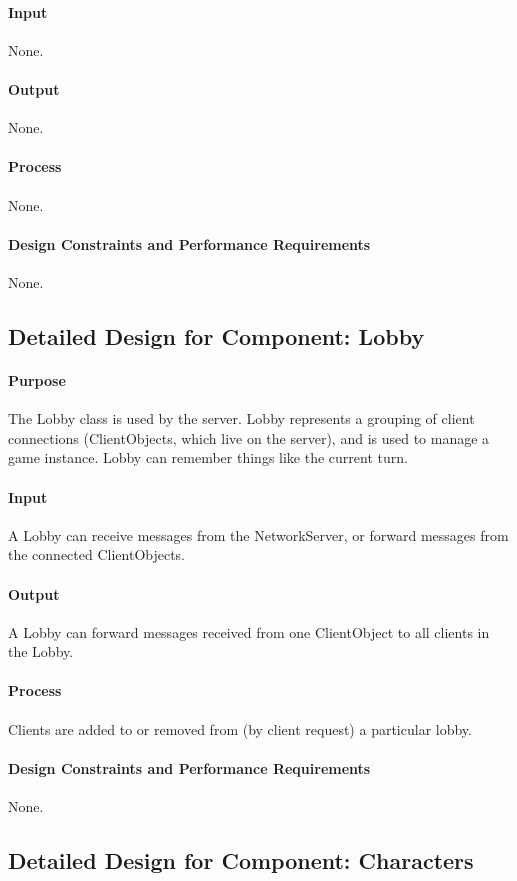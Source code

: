 \documentclass[12pt,a4paper,titlepage]{article}
\begin{document}
\paragraph{Input} None.
\paragraph{Output} None.
\paragraph{Process} None.
\paragraph{Design Constraints and Performance Requirements} None.
	
\subsection{Detailed Design for Component: Lobby }
\paragraph{Purpose} The Lobby class is used by the server. Lobby represents a grouping of client connections (ClientObjects, which live on the server), and is used to manage a game instance. Lobby can remember things like the current turn. 
\paragraph{Input} A Lobby can receive messages from the NetworkServer, or forward messages from the connected ClientObjects. 
\paragraph{Output} A Lobby can forward messages received from one ClientObject to all clients in the Lobby.
\paragraph{Process} Clients are added to or removed from (by client request) a particular lobby. 
\paragraph{Design Constraints and Performance Requirements} None.

\subsection{Detailed Design for Component: Characters}
\end{document}
